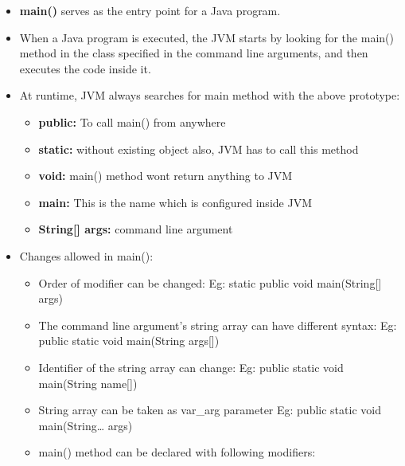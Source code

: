 

\begin{flushleft}
	
	\begin{itemize}
		\item \textbf{main()} serves as the entry point for a Java program. 
		\item When a Java program is executed, the JVM starts by looking for the main() method in the class specified in the command line arguments, and then executes the code inside it.
		\bigskip
		\bigskip
		\item At runtime, JVM always searches for main method with the above prototype:
		\begin{itemize}
			\item \textbf{public:} To call main() from anywhere
			\item \textbf{static:} without existing object also, JVM has to call this method
			\item \textbf{void:} main() method wont return anything to JVM
			\item \textbf{main:} This is the name which is configured inside JVM
			\item \textbf{String[] args:} command line argument
		\end{itemize}
		\bigskip
		\bigskip
		\item Changes allowed in main():
		\begin{itemize}
			\item Order of modifier can be changed:
			\newline
			Eg: static public void main(String[] args)
			\item The command line argument’s string array can have different syntax:
			\newline
			Eg: public static void main(String args[])
			\item Identifier of the string array can change:
			\newline
			Eg: public static void main(String name[])
			\item String array can be taken as var\_arg parameter
			\newline
			Eg: public static void main(String… args)
			\item main() method can be declared with following modifiers:
			\begin{itemize}

\end{itemize}
\end{itemize}
\end{itemize}
\end{flushleft}
